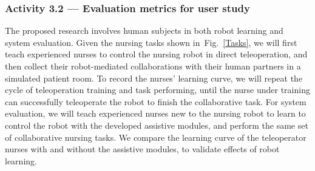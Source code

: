 \documentclass[letterpaper, 11 pt, onecolumn]{article}
\newcommand{\fig}[1]{Fig.~\ref{#1}}
\begin{document}





 






\subsubsection{Activity 3.2 --- Evaluation metrics for user study}\label{sec:plan-implementation-userstudy}
The proposed research involves human subjects in both robot learning and system evaluation. Given the nursing tasks shown in~\fig{Tasks}, we will first teach experienced nurses to control the nursing robot in direct teleoperation, and then collect their robot-mediated collaborations with their human partners in a simulated patient room. To record the nurses' learning curve, we will repeat the cycle of teleoperation training and task performing, until the nurse under training can successfully teleoperate the robot to finish the collaborative task. For system evaluation, we will teach experienced nurses new to the nursing robot to learn to control the robot with the developed assistive modules, and perform the same set of collaborative nursing tasks. We compare the learning curve of the teleoperator nurses with and without the assistive modules, to validate effects of robot learning.
\end{document}
